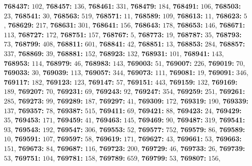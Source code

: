 \textsf{\bfseries 768437:} $102$, \textsf{\bfseries 768457:} $136$, \textsf{\bfseries 768461:} $331$, \textsf{\bfseries 768479:} $184$, \textsf{\bfseries 768491:} $106$, \textsf{\bfseries 768503:} $23$, \textsf{\bfseries 768541:} $30$, \textsf{\bfseries 768563:} $519$, \textsf{\bfseries 768571:} $11$, \textsf{\bfseries 768589:} $109$, \textsf{\bfseries 768613:} $11$, \textsf{\bfseries 768623:} $5$, \textsf{\bfseries 768629:} $217$, \textsf{\bfseries 768631:} $301$, \textsf{\bfseries 768641:} $156$, \textsf{\bfseries 768643:} $178$, \textsf{\bfseries 768653:} $146$, \textsf{\bfseries 768671:} $113$, \textsf{\bfseries 768727:} $172$, \textsf{\bfseries 768751:} $157$, \textsf{\bfseries 768767:} $5$, \textsf{\bfseries 768773:} $19$, \textsf{\bfseries 768787:} $35$, \textsf{\bfseries 768793:} $73$, \textsf{\bfseries 768799:} $408$, \textsf{\bfseries 768811:} $601$, \textsf{\bfseries 768841:} $42$, \textsf{\bfseries 768851:} $13$, \textsf{\bfseries 768853:} $284$, \textsf{\bfseries 768857:} $337$, \textsf{\bfseries 768869:} $39$, \textsf{\bfseries 768881:} $152$, \textsf{\bfseries 768923:} $132$, \textsf{\bfseries 768931:} $101$, \textsf{\bfseries 768941:} $143$, \textsf{\bfseries 768953:} $114$, \textsf{\bfseries 768979:} $46$, \textsf{\bfseries 768983:} $143$, \textsf{\bfseries 769003:} $51$, \textsf{\bfseries 769007:} $226$, \textsf{\bfseries 769019:} $70$, \textsf{\bfseries 769033:} $30$, \textsf{\bfseries 769039:} $113$, \textsf{\bfseries 769057:} $344$, \textsf{\bfseries 769073:} $111$, \textsf{\bfseries 769081:} $19$, \textsf{\bfseries 769091:} $346$, \textsf{\bfseries 769117:} $182$, \textsf{\bfseries 769123:} $123$, \textsf{\bfseries 769147:} $57$, \textsf{\bfseries 769151:} $443$, \textsf{\bfseries 769159:} $132$, \textsf{\bfseries 769169:} $189$, \textsf{\bfseries 769207:} $70$, \textsf{\bfseries 769231:} $69$, \textsf{\bfseries 769243:} $92$, \textsf{\bfseries 769247:} $354$, \textsf{\bfseries 769259:} $251$, \textsf{\bfseries 769261:} $285$, \textsf{\bfseries 769273:} $99$, \textsf{\bfseries 769289:} $187$, \textsf{\bfseries 769297:} $41$, \textsf{\bfseries 769309:} $172$, \textsf{\bfseries 769319:} $190$, \textsf{\bfseries 769339:} $137$, \textsf{\bfseries 769357:} $78$, \textsf{\bfseries 769387:} $515$, \textsf{\bfseries 769411:} $69$, \textsf{\bfseries 769421:} $88$, \textsf{\bfseries 769423:} $24$, \textsf{\bfseries 769429:} $35$, \textsf{\bfseries 769453:} $171$, \textsf{\bfseries 769459:} $41$, \textsf{\bfseries 769463:} $145$, \textsf{\bfseries 769469:} $90$, \textsf{\bfseries 769487:} $319$, \textsf{\bfseries 769541:} $93$, \textsf{\bfseries 769543:} $192$, \textsf{\bfseries 769547:} $306$, \textsf{\bfseries 769553:} $52$, \textsf{\bfseries 769577:} $752$, \textsf{\bfseries 769579:} $86$, \textsf{\bfseries 769589:} $10$, \textsf{\bfseries 769591:} $107$, \textsf{\bfseries 769597:} $58$, \textsf{\bfseries 769619:} $171$, \textsf{\bfseries 769627:} $43$, \textsf{\bfseries 769661:} $53$, \textsf{\bfseries 769663:} $151$, \textsf{\bfseries 769673:} $84$, \textsf{\bfseries 769687:} $116$, \textsf{\bfseries 769723:} $200$, \textsf{\bfseries 769729:} $46$, \textsf{\bfseries 769733:} $26$, \textsf{\bfseries 769739:} $53$, \textsf{\bfseries 769751:} $104$, \textsf{\bfseries 769781:} $158$, \textsf{\bfseries 769789:} $659$, \textsf{\bfseries 769799:} $53$, \textsf{\bfseries 769807:} $156$, 
